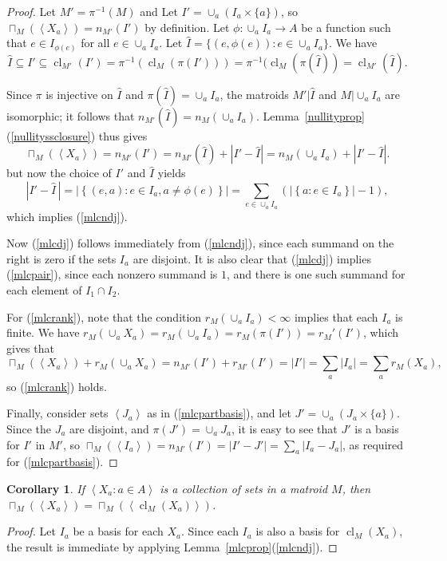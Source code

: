 \documentclass{amsart}
\theoremstyle{plain}
\newtheorem{corollary}[theorem]{Corollary}
\theoremstyle{definition}
\DeclareMathOperator{\cl}{cl}
\newcommand{\wh}{\widehat}
\newcommand{\abs}[1]{\left| #1 \right|}
\newcommand{\set}[1]{\left\{#1\right\}}
\newcommand{\br}[1]{\left(#1\right)}
\newcommand{\ab}[1]{\left\langle#1\right\rangle}
\renewcommand{\ss}{\subseteq}
\newcommand{\setof}[2]{\set{{#1} : {#2}}}
\begin{document}
\begin{proof}
  Let $M' = \pi^{-1}(M)$ and Let $I' = \cup_a (I_a \times \{a\})$, 
  so $\sqcap_M(\ab{X_a}) = n_{M'}(I')$ by definition. 
  Let $\phi : \cup_a I_a \to A$ be a function such that $e \in I_{\phi(e)}$ 
  for all $e \in \cup_a I_a$. 
  Let $\wh{I} = \{(e, \phi (e)) : e \in \cup_a I_a\}$. We have 
  \[\wh{I} \ss I' \ss \cl_{M'}(I') = \pi^{-1}(\cl_M(\pi(I'))) = \pi^{-1}(\cl_M(\pi(\wh{I}))
  = \cl_{M'}(\wh{I}).\]
  
  Since $\pi$ is injective on $\wh{I}$ and $\pi(\wh{I}) = \cup_{a}I_a$, 
  the matroids $M' | \wh{I}$ and $M | \cup_a I_a$ are isomorphic;
  it follows that $n_{M'}(\wh{I}) = n_M(\cup_a I_a)$. 
  Lemma~\ref{nullityprop}(\ref{nullityssclosure}) thus gives
  \[\sqcap_M(\ab{X_a}) = n_{M'}(I') = n_{M'}(\wh{I}) + |I' - \wh{I}| = n_M(\cup_a I_a) + |I' - \wh{I}|.\]
  but now the choice of $I'$ and $\wh{I}$ yields
  \[\abs{I' - \wh{I}\,} = \abs{\setof{(e,a)}{e \in I_a, a \ne \phi(e)}} = \sum_{e \in \cup_a I_a} \br{\abs{\setof{a}{e \in I_a}} -1},\]
  which implies (\ref{mlcndj}). 

  Now (\ref{mlcdj}) follows immediately from (\ref{mlcndj}), since each summand on the 
  right is zero if the sets $I_a$ are disjoint. It is also clear that (\ref{mlcdj}) implies (\ref{mlcpair}), 
  since each nonzero summand is $1$, and there is one such summand for each element of $I_1 \cap I_2$. 
  
  For (\ref{mlcrank}), 
  note that the condition $r_M(\cup_a I_a) < \infty$ implies that each $I_a$ is finite. 
  We have $r_M(\cup_a X_a) = r_M(\cup_a I_a) = r_M(\pi(I')) = r_M'(I')$, 
  which gives that 
  \[\sqcap_M(\ab{X_a}) + r_M(\cup_a X_a) = n_{M'}(I') + r_{M'}(I') = |I'| = \sum_a |I_a| = \sum_{a}r_M(X_a),\]
  so (\ref{mlcrank}) holds.  

  Finally, consider sets $\ab{J_a}$ as in (\ref{mlcpartbasis}), and let $J' = \cup_a (J_a \times \{a\})$. 
  Since the $J_a$ are disjoint, and $\pi(J') = \cup_a J_a$, it is easy to see that $J'$ is a basis for $I'$ in $M'$, 
  so $\sqcap_{M}(\ab{I_a}) = n_{M'}(I') = \abs{I' - J'} = \sum_{a}|I_a - J_a|$, as required for (\ref{mlcpartbasis}). 
\end{proof}

\begin{corollary}\label{lcclosure}
  If $\ab{X_a : a \in A}$ is a collection of sets in a matroid $M$, 
  then $\sqcap_M(\ab{X_a}) = \sqcap_M(\ab{\cl_M(X_a)})$. 
\end{corollary}
\begin{proof}
  Let $I_a$ be a basis for each $X_a$. Since each $I_a$ is also a basis for $\cl_M(X_a)$,
  the result is immediate by applying Lemma~\ref{mlcprop}(\ref{mlcndj}). 
\end{proof}
\end{document}

